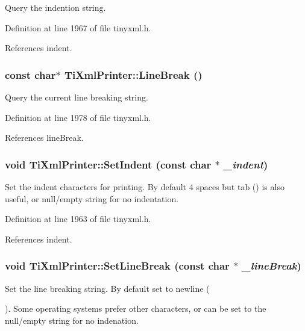 Query the indention string. 

Definition at line 1967 of file tinyxml.h.

References indent.\hypertarget{class_ti_xml_printer_a11f1b4804a460b175ec244eb5724d96d}{
\subsubsection[{LineBreak}]{\setlength{\rightskip}{0pt plus 5cm}const char$\ast$ TiXmlPrinter::LineBreak ()}}
\label{class_ti_xml_printer_a11f1b4804a460b175ec244eb5724d96d}


Query the current line breaking string. 

Definition at line 1978 of file tinyxml.h.

References lineBreak.\hypertarget{class_ti_xml_printer_a213377a4070c7e625bae59716b089e5e}{
\subsubsection[{SetIndent}]{\setlength{\rightskip}{0pt plus 5cm}void TiXmlPrinter::SetIndent (const char $\ast$ {\em \_\-indent})}}
\label{class_ti_xml_printer_a213377a4070c7e625bae59716b089e5e}
Set the indent characters for printing. By default 4 spaces but tab () is also useful, or null/empty string for no indentation. 

Definition at line 1963 of file tinyxml.h.

References indent.\hypertarget{class_ti_xml_printer_a4be1e37e69e3858c59635aa947174fe6}{
\subsubsection[{SetLineBreak}]{\setlength{\rightskip}{0pt plus 5cm}void TiXmlPrinter::SetLineBreak (const char $\ast$ {\em \_\-lineBreak})}}
\label{class_ti_xml_printer_a4be1e37e69e3858c59635aa947174fe6}
Set the line breaking string. By default set to newline (\par
). Some operating systems prefer other characters, or can be set to the null/empty string for no indenation. 

